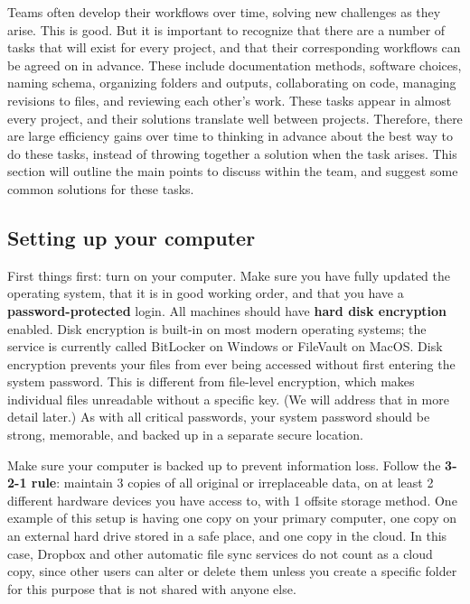 Teams often develop their workflows over time,
solving new challenges as they arise.
This is good. But it is important to recognize
that there are a number of tasks that will exist for every project,
and that their corresponding workflows can be agreed on in advance.
These include documentation methods, software choices,
naming schema, organizing folders and outputs, collaborating on code,
managing revisions to files, and reviewing each other's work.
These tasks appear in almost every project,
and their solutions translate well between projects.
Therefore, there are large efficiency gains over time to
thinking in advance about the best way to do these tasks,
instead of throwing together a solution when the task arises.
This section will outline the main points to discuss within the team,
and suggest some common solutions for these tasks.

\subsection{Setting up your computer}

First things first: turn on your computer.
Make sure you have fully updated the operating system,
that it is in good working order,
and that you have a \textbf{password-protected} login.
All machines should have \textbf{hard disk encryption} enabled.
Disk encryption is built-in on most modern operating systems;
the service is currently called BitLocker on Windows or FileVault on MacOS.
Disk encryption prevents your files from ever being accessed
without first entering the system password.
This is different from file-level encryption,
which makes individual files unreadable without a specific key.
(We will address that in more detail later.)
As with all critical passwords, your system password should be strong,
memorable, and backed up in a separate secure location.

Make sure your computer is backed up to prevent information loss.
Follow the \textbf{3-2-1 rule}: maintain 3 copies of all original or irreplaceable data,
on at least 2 different hardware devices you have access to,
with 1 offsite storage method.
One example of this setup is having one copy on your primary computer,
one copy on an external hard drive stored in a safe place,
and one copy in the cloud.
In this case, Dropbox and other automatic file sync services do not count as a cloud copy,
since other users can alter or delete them
unless you create a specific folder for this purpose that is not shared with anyone else.

